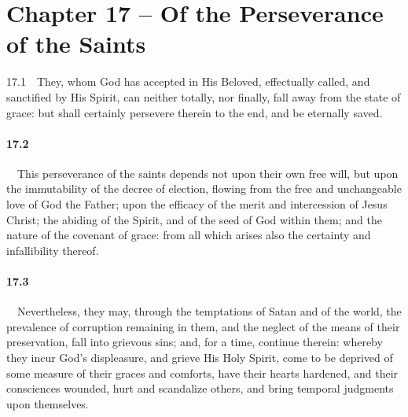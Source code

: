 \section{Chapter 17 -- Of the Perseverance of the Saints} 17.1\ \ They, whom God has accepted in His Beloved, effectually called, and sanctified by His Spirit, can neither totally, nor finally, fall away from the state of grace: but shall certainly persevere therein to the end, and be eternally saved.   
\bigskip
\paragraph{17.2}\ \ This perseverance of the saints depends not upon their own free will, but upon the immutability of the decree of election, flowing from the free and unchangeable love of God the Father; upon the efficacy of the merit and intercession of Jesus Christ; the abiding of the Spirit, and of the seed of God within them; and the nature of the covenant of grace: from all which arises also the certainty and infallibility thereof.   
\bigskip
\paragraph{17.3}\ \ Nevertheless, they may, through the temptations of Satan and of the world, the prevalence of corruption remaining in them, and the neglect of the means of their preservation, fall into grievous sins; and, for a time, continue therein: whereby they incur God's displeasure, and grieve His Holy Spirit, come to be deprived of some measure of their graces and comforts, have their hearts hardened, and their consciences wounded, hurt and scandalize others, and bring temporal judgments upon themselves.

